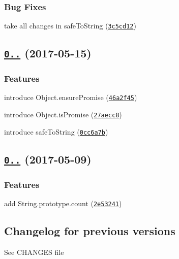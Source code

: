 \subsubsection*{Bug Fixes}


\begin{DoxyItemize}
\item take all changes in safe\+To\+String (\href{https://github.com/medikoo/es5-ext/commit/3c5cd12}{\tt 3c5cd12})
\end{DoxyItemize}

\label{_0.10.17}%
 \subsection*{\href{https://github.com/medikoo/es5-ext/compare/v0.10.16...v0.10.17}{\tt 0..} (2017-\/05-\/15)}

\subsubsection*{Features}


\begin{DoxyItemize}
\item introduce Object.\+ensure\+Promise (\href{https://github.com/medikoo/es5-ext/commit/46a2f45}{\tt 46a2f45})
\item introduce Object.\+is\+Promise (\href{https://github.com/medikoo/es5-ext/commit/27aecc8}{\tt 27aecc8})
\item introduce safe\+To\+String (\href{https://github.com/medikoo/es5-ext/commit/0cc6a7b}{\tt 0cc6a7b})
\end{DoxyItemize}

\label{_0.10.16}%
 \subsection*{\href{https://github.com/medikoo/es5-ext/compare/v0.10.15...v0.10.16}{\tt 0..} (2017-\/05-\/09)}

\subsubsection*{Features}


\begin{DoxyItemize}
\item add String.\+prototype.\+count (\href{https://github.com/medikoo/es5-ext/commit/2e53241}{\tt 2e53241})
\end{DoxyItemize}

\subsection*{Changelog for previous versions}

See {\ttfamily C\+H\+A\+N\+G\+ES} file 